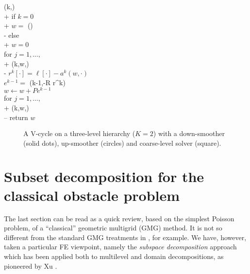 \documentclass[letterpaper,final,12pt,reqno]{amsart}
\begin{document}
\begin{pseudo*}
(k,\ell)\text{:} \\+
    if $k=0$ \\+
        $w =$ (\ell) \\-  %
    else \\+
        $w=0$ \\
        for $j=1,\dots,$ \\+
            (k,w,\ell) \\-
        $r^k[\cdot] = \ell[\cdot] - a^k(w,\cdot)$ \\
        $e^{k-1} =$ (k-1,-R r^k) \\
        $w \gets w + P e^{k-1}$ \\
        for $j=1,\dots,$ \\+
            (k,w,\ell) \\--
    return $w$
\end{pseudo*}

\begin{figure}

\caption{A V-cycle on a three-level hierarchy ($K=2$) with a down-smoother (solid dots), up-smoother (circles) and coarse-level solver (square).}
\label{fig:vcycle}
\end{figure}


\section{Subset decomposition for the classical obstacle problem} \label{sec:obstacle}

The last section can be read as a quick review, based on the simplest Poisson problem, of a ``classical'' geometric multigrid (GMG) method.  It is not so different from the standard GMG treatments in \cite{Briggsetal2000,Bueler2021,Trottenbergetal2001}, for example.  We have, however, taken a particular FE viewpoint, namely the \emph{subspace decomposition} approach which has been applied both to multilevel and domain decompositions, as pioneered by Xu \cite{Xu1992}.
\end{document}
